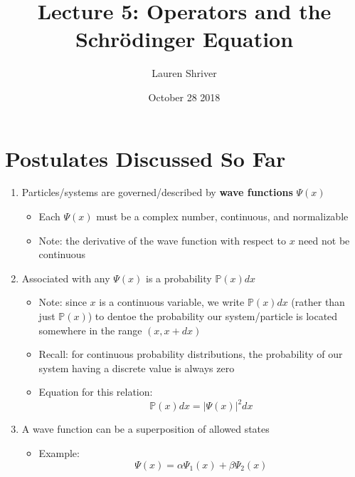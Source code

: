 \documentclass{article}
\title{Lecture 5: Operators and the Schr\"{o}dinger Equation}
\author{Lauren Shriver}
\date{October 28 2018}
\begin{document}
\maketitle

\section*{Postulates Discussed So Far}
\begin{enumerate}
    \item Particles/systems are governed/described by \textbf{wave functions} $\Psi(x)$
        \begin{itemize}
            \item Each $\Psi(x)$ must be a complex number, continuous, and normalizable
            \item Note: the derivative of the wave function with respect to $x$ need not be continuous 
        \end{itemize}
    \item Associated with any $\Psi(x)$ is a probability $\mathbb{P}(x)dx$
        \begin{itemize}
            \item Note: since $x$ is a continuous variable, we write $\mathbb{P}(x)dx$ (rather than just $\mathbb{P}(x)$) to dentoe the probability our system/particle is located somewhere in the range $(x,x+dx)$
            \item Recall: for continuous probability distributions, the probability of our system having a discrete value is always zero
            \item Equation for this relation: 
                \begin{equation}
                    \mathbb{P}(x)dx=|\Psi(x)|^2dx
                \end{equation}
        \end{itemize}
    \item A wave function can be a superposition of allowed states 
        \begin{itemize}
            \item Example: 
                \begin{equation}
                    \Psi(x) = \alpha\Psi_1(x) + \beta\Psi_2(x) 
                \end{equation}
        \end{itemize}
\end{enumerate}
\end{document}
